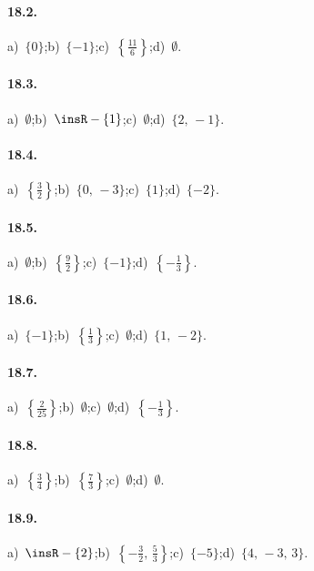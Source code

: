 \paragraph{18.2.}
a)~$\{0\}$;\quad b)~$\{-1\}$;\quad c)~$\left\{\frac{11}{6}\right\}$;\quad d)~$\emptyset$.

\paragraph{18.3.}
a)~$\emptyset$;\quad b)~$\insR-\{1\}$;\quad c)~$\emptyset$;\quad d)~$\{2\text{,~}-1\}$.

\paragraph{18.4.}
a)~$\left\{\frac{3}{2}\right\}$;\quad b)~$\{0\text{,~}-3\}$;\quad c)~$\{1\}$;\quad d)~$\{-2\}$.

\paragraph{18.5.}
a)~$\emptyset$;\quad b)~$\left\{\frac{9}{2}\right\}$;\quad c)~$\{-1\}$;\quad d)~$\left\{-{\frac{1}{3}}\right\}$.

\paragraph{18.6.}
a)~$\{-1\}$;\quad b)~$\left\{\frac{1}{3}\right\}$;\quad c)~$\emptyset$;\quad d)~$\{1\text{,~}-2\}$.

\paragraph{18.7.}
a)~$\left\{\frac{2}{25}\right\}$;\quad b)~$\emptyset$;\quad c)~$\emptyset$;\quad d)~$\left\{-{\frac{1}{3}}\right\}$.

\paragraph{18.8.}
a)~$\left\{\frac{3}{4}\right\}$;\quad b)~$\left\{\frac{7}{3}\right\}$;\quad c)~$\emptyset$;\quad d)~$\emptyset$.

\paragraph{18.9.}
a)~$\insR-\{2\}$;\quad b)~$\left\{-{\frac{3}{2}}\text{,~}\frac{5}{3}\right\}$;\quad c)~$\{-5\}$;\quad d)~$\{4\text{,~}-3\text{,~}3\}$.

